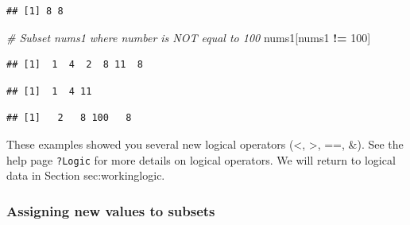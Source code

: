 \documentclass[]{book}
\newenvironment{Shaded}{\begin{snugshade}}{\end{snugshade}}
\newcommand{\CommentTok}[1]{\textcolor[rgb]{0.56,0.35,0.01}{\textit{#1}}}
\newcommand{\DecValTok}[1]{\textcolor[rgb]{0.00,0.00,0.81}{#1}}
\newcommand{\KeywordTok}[1]{\textcolor[rgb]{0.13,0.29,0.53}{\textbf{#1}}}
\newcommand{\NormalTok}[1]{#1}
\newcommand{\OperatorTok}[1]{\textcolor[rgb]{0.81,0.36,0.00}{\textbf{#1}}}
\newcommand{\StringTok}[1]{\textcolor[rgb]{0.31,0.60,0.02}{#1}}
\begin{document}
\begin{verbatim}
## [1] 8 8
\end{verbatim}

\begin{Shaded}
\begin{Highlighting}[]
\CommentTok{# Subset nums1 where number is NOT equal to 100}
\NormalTok{nums1[nums1 }\OperatorTok{!=}\StringTok{ }\DecValTok{100}\NormalTok{]}
\end{Highlighting}
\end{Shaded}

\begin{verbatim}
## [1]  1  4  2  8 11  8
\end{verbatim}

\begin{Shaded}
\end{Shaded}

\begin{verbatim}
## [1]  1  4 11
\end{verbatim}

\begin{Shaded}
\end{Shaded}

\begin{verbatim}
## [1]   2   8 100   8
\end{verbatim}

These examples showed you several new logical operators (\textless, \textgreater, ==, \&). See the help page \texttt{?Logic} for more details on logical operators. We will return to logical data in Section sec:workinglogic.

\hypertarget{assigning-new-values-to-subsets}{%
\subsubsection{Assigning new values to subsets}\label{assigning-new-values-to-subsets}}
\end{document}
